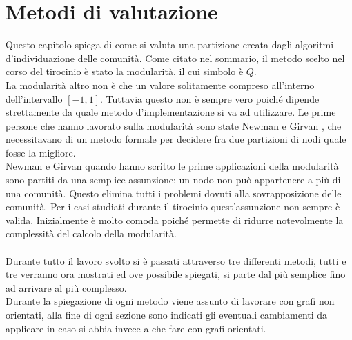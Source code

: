 %
%
\chapter{Metodi di valutazione}
Questo capitolo spiega di come si valuta una partizione creata dagli algoritmi d'individuazione delle comunità. Come citato nel sommario, il metodo scelto nel corso del tirocinio è stato la modularità, il cui simbolo è $Q$.\\
La modularità altro non è che un valore solitamente compreso all'interno dell'intervallo $[-1, 1]$. Tuttavia questo non è sempre vero poiché dipende strettamente da quale metodo d'implementazione si va ad utilizzare. Le prime persone che hanno lavorato sulla modularità sono state Newman e Girvan , che necessitavano di un metodo formale per decidere fra due partizioni di nodi quale fosse la migliore.\\
Newman e Girvan  quando hanno scritto le prime applicazioni della modularità sono partiti da una semplice assunzione: un nodo non può appartenere a più di una comunità. Questo elimina tutti i problemi dovuti alla sovrapposizione delle comunità. Per i casi studiati durante il tirocinio quest'assunzione non sempre è valida. Inizialmente è molto comoda poiché permette di ridurre notevolmente la complessità del calcolo della modularità.\\
\\
Durante tutto il lavoro svolto si è passati attraverso tre differenti metodi, tutti e tre verranno ora mostrati ed ove possibile spiegati, si parte dal più semplice fino ad arrivare al più complesso.\\ Durante la spiegazione di ogni metodo viene assunto di lavorare con grafi non orientati, alla fine di ogni sezione sono indicati gli eventuali cambiamenti da applicare in caso si abbia invece a che fare con grafi orientati.
%
